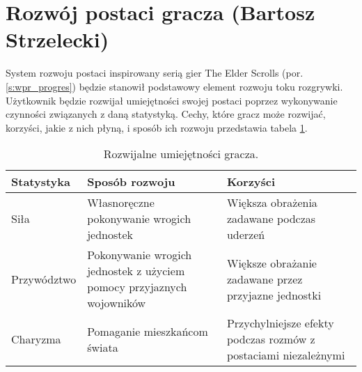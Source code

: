 \section{Rozwój postaci gracza (Bartosz Strzelecki)}\label{s:proj_progres}
System rozwoju postaci inspirowany serią gier The Elder Scrolls (por. \ref{s:wpr_progres}) będzie stanowił podstawowy element rozwoju toku rozgrywki.
Użytkownik będzie rozwijał umiejętności swojej postaci poprzez wykonywanie czynności związanych z daną statystyką.
Cechy, które gracz może rozwijać, korzyści, jakie z nich płyną, i sposób ich rozwoju przedstawia tabela \ref{fig:prog}.

\begin{table}[h]
\caption{Rozwijalne umiejętności gracza.}
\begin{center}
  \begin{tabular}{ | m{10em} | m{10em} | m{10em} | }
  \hline
    Statystyka & Sposób rozwoju & Korzyści \\
  \hline\hline
    Siła & Własnoręczne pokonywanie wrogich jednostek & Większa obrażenia zadawane podczas uderzeń \\
    Przywództwo & Pokonywanie wrogich jednostek z użyciem pomocy przyjaznych wojowników & Większe obrażanie zadawane przez przyjazne jednostki \\
    Charyzma & Pomaganie mieszkańcom świata & Przychylniejsze efekty podczas rozmów z postaciami niezależnymi \\
  \hline
  \end{tabular}
\end{center}
\label{fig:prog}
\end{table}
